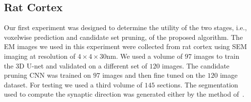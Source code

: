 \documentclass{llncs}
\begin{document}
 
\subsection{Rat Cortex}\label{S:RAT}
Our first experiment was designed to determine the utility of the two stages, i.e., voxelwise prediction and candidate set pruning, of the  proposed algorithm. The EM images we used in this experiment were collected from rat cortex using SEM imaging at resolution of $4\times 4\times 30$nm. We used a volume of $97$ images to train the 3D U-net and validated on a different set of $120$ images. The candidate pruning CNN was trained on $97$ images and then fine tuned on the $120$ image dataset. For testing we used a third volume of $145$ sections. The segmentation used to compute the synaptic direction was generated either by the method of~\cite{parag17arxiv}.
\end{document}
